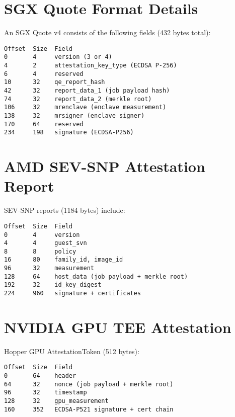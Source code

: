\documentclass[11pt,letterpaper]{article}
\begin{document}
\appendix

\section{SGX Quote Format Details}

An SGX Quote v4 consists of the following fields (432 bytes total):

\begin{lstlisting}
Offset  Size  Field
0       4     version (3 or 4)
4       2     attestation_key_type (ECDSA P-256)
6       4     reserved
10      32    qe_report_hash
42      32    report_data_1 (job payload hash)
74      32    report_data_2 (merkle root)
106     32    mrenclave (enclave measurement)
138     32    mrsigner (enclave signer)
170     64    reserved
234     198   signature (ECDSA-P256)
\end{lstlisting}

\section{AMD SEV-SNP Attestation Report}

SEV-SNP reports (1184 bytes) include:

\begin{lstlisting}
Offset  Size  Field
0       4     version
4       4     guest_svn
8       8     policy
16      80    family_id, image_id
96      32    measurement
128     64    host_data (job payload + merkle root)
192     32    id_key_digest
224     960   signature + certificates
\end{lstlisting}

\section{NVIDIA GPU TEE Attestation}

Hopper GPU AttestationToken (512 bytes):

\begin{lstlisting}
Offset  Size  Field
0       64    header
64      32    nonce (job payload + merkle root)
96      32    timestamp
128     32    gpu_measurement
160     352   ECDSA-P521 signature + cert chain
\end{lstlisting}
\end{document}

